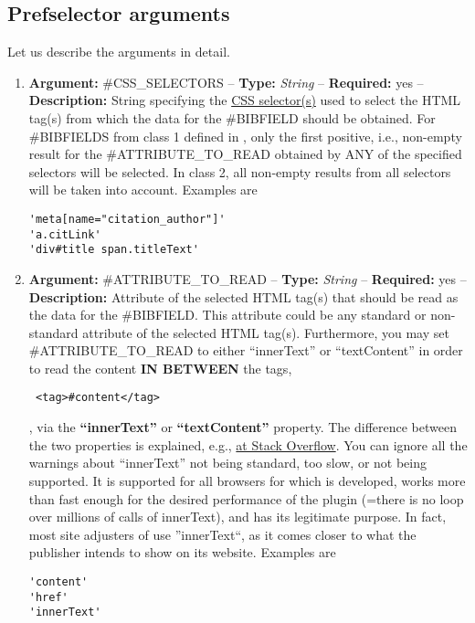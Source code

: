 \documentclass[
a4paper,
12pt,
]
{article}
\begin{document}
\subsection{Prefselector arguments}
Let us describe the arguments in detail.
\begin{enumerate}
 \item \textbf{Argument:} \#CSS\_SELECTORS -- \textbf{Type:} \textit{String} -- \textbf{Required:} yes -- \textbf{Description:} String specifying the \href{https://www.w3schools.com/cssref/css_selectors.asp}{CSS selector(s)} used to select the HTML tag(s) from which the data for the \#BIBFIELD should be obtained. For \#BIBFIELDS from class 1 defined in , only the first positive, i.e., non-empty result for the \#ATTRIBUTE\_TO\_READ obtained by ANY of the specified selectors will be selected. In class 2, all non-empty results from all selectors will be taken into account. Examples are
 \begin{center}
\begin{lstlisting}
'meta[name="citation_author"]'
'a.citLink'
'div#title span.titleText'
\end{lstlisting}
\end{center}

 \item \textbf{Argument:} \#ATTRIBUTE\_TO\_READ -- \textbf{Type:} \textit{String} -- \textbf{Required:} yes -- \textbf{Description:} Attribute of the selected HTML tag(s) that should be read as the data for the \#BIBFIELD. This attribute could be any standard or non-standard attribute of the selected HTML tag(s). Furthermore, you may set \#ATTRIBUTE\_TO\_READ to either ``innerText'' or ``textContent'' in order to read the content \textbf{IN BETWEEN} the tags,
 \begin{center}
\begin{lstlisting}
 <tag>#content</tag>
\end{lstlisting}
\end{center}
 , via the \textbf{``innerText''} or \textbf{``textContent''} property. 
 The difference between the two properties is explained, e.g., \href{https://stackoverflow.com/questions/35213147/difference-between-text-content-vs-inner-text}{at Stack Overflow}. 
 You can ignore all the warnings about ``innerText'' not being standard, too slow, or not being supported. It is supported for all browsers for which {\plgname} is developed, works more than fast enough for the desired performance of the plugin (=there is no loop over millions of calls of innerText), and has its legitimate purpose. In fact, most site adjusters of {\plgname} use ''innerText``, as it comes closer to what the publisher intends to show on its website. Examples are
\begin{center}
\begin{lstlisting}
'content'
'href'
'innerText'
\end{lstlisting}
\end{center}


\end{enumerate}
\end{document}
